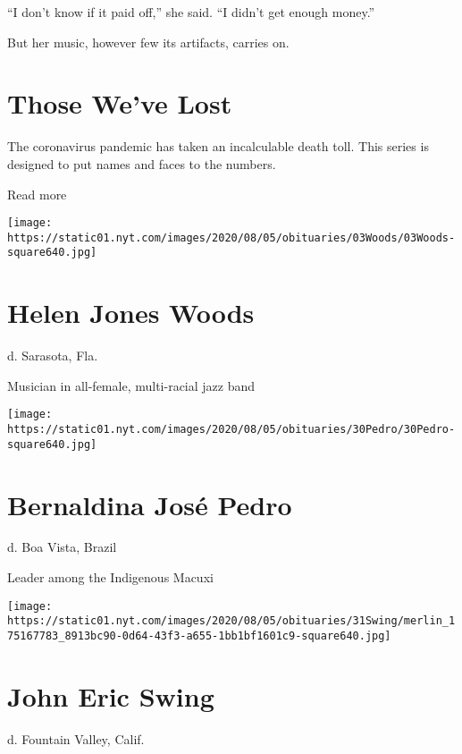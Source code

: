 ``I don't know if it paid off,'' she said. ``I didn't get enough
money.''

But her music, however few its artifacts, carries on.

\href{https://www.nytimes.com/interactive/2020/obituaries/people-died-coronavirus-obituaries.html?action=click\&pgtype=Article\&state=default\&region=BELOW_MAIN_CONTENT\&context=covid_obits_promo}{}

\hypertarget{those-weve-lost}{%
\section{Those We've Lost}\label{those-weve-lost}}

The coronavirus pandemic has taken an incalculable death toll. This
series is designed to put names and faces to the numbers.

Read more

\texttt{[image: https://static01.nyt.com/images/2020/08/05/obituaries/03Woods/03Woods-square640.jpg]}

\hypertarget{helen-jones-woods}{%
\section{Helen Jones Woods}\label{helen-jones-woods}}

d. Sarasota, Fla.

Musician in all-female, multi-racial jazz band

\texttt{[image: https://static01.nyt.com/images/2020/08/05/obituaries/30Pedro/30Pedro-square640.jpg]}

\hypertarget{bernaldina-josuxe9-pedro}{%
\section{Bernaldina José Pedro}\label{bernaldina-josuxe9-pedro}}

d. Boa Vista, Brazil

Leader among the Indigenous Macuxi

\texttt{[image: https://static01.nyt.com/images/2020/08/05/obituaries/31Swing/merlin\_175167783\_8913bc90-0d64-43f3-a655-1bb1bf1601c9-square640.jpg]}

\hypertarget{john-eric-swing}{%
\section{John Eric Swing}\label{john-eric-swing}}

d. Fountain Valley, Calif.

